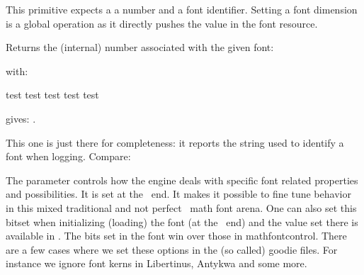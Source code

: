 This primitive expects a a number and a font identifier. Setting a font dimension
is a global operation as it directly pushes the value in the font resource.

\stopoldprimitive

\startnewprimitive[title={\prm {fontid}}]

Returns the (internal) number associated with the given font:

\startbuffer
{\bf \xdef\MyFontA{\the\fontid\font}}
{\sl \xdef\MyFontB{\setfontid\the\fontid\font}}
\stopbuffer

\typebuffer \getbuffer

with:

\startbuffer
test {\setfontid\MyFontA test} test {\MyFontB test} test
\stopbuffer

\typebuffer

gives: \inlinebuffer.

\stopnewprimitive

\startnewprimitive[title={\prm {fontidentifier}}]

This one is just there for completeness: it reports the string used to identify a
font when logging. Compare:

\starttabulate
\NC \type {\fontname      \font} \NC \fontname      \font \NC \NR
\NC \type {\fontidentifier\font} \NC \fontidentifier\font \NC \NR
\NC \type {\the\fontid    \font} \NC \the\fontid    \font \NC \NR
\stoptabulate

\stopnewprimitive

\startnewprimitive[title={\prm {fontmathcontrol}}]

The  parameter controls how the engine deals with specific
font related properties and possibilities. It is set at the \TEX\ end. It makes
it possible to fine tune behavior in this mixed traditional and not perfect
\OPENTYPE\ math font arena. One can also set this bitset when initializing
(loading) the font (at the \LUA\ end) and the value set there is available in
. The bits set in the font win over those in \prm
{mathfontcontrol}. There are a few cases where we set these options in the (so
called) goodie files. For instance we ignore font kerns in Libertinus, Antykwa
and some more.


